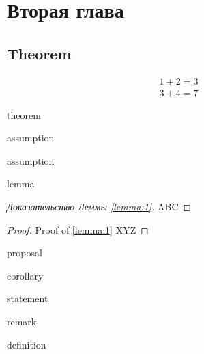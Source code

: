 \chapter{Вторая глава}
\label{ch:ch2}

\section{Theorem} \label{chap1:sec1}

	\begin{align} \label{eq:sec1}
		1+2=3	\\
		3+4=7
	\end{align}

	\begin{theorem}
		theorem
	\end{theorem}
	
	\begin{assumption}
		assumption
	\end{assumption}
	\begin{assumption}
		assumption
	\end{assumption}
	
	\begin{lemma}
		\label{lemma:1}
		lemma
	\end{lemma}
	
	\begin{proof}[Доказательство Леммы \ref{lemma:1}]
		ABC 
	\end{proof}
	\begin{proof} Proof of \cref{lemma:1}
		XYZ
	\end{proof}
	
	\begin{proposal}
		proposal
	\end{proposal}
		
	\begin{corollary}
		corollary
	\end{corollary}
	
	\begin{statement}
		statement
	\end{statement}
	
	\begin{remark}
		remark
	\end{remark}
	
	\begin{definition}
		definition
	\end{definition}
	
